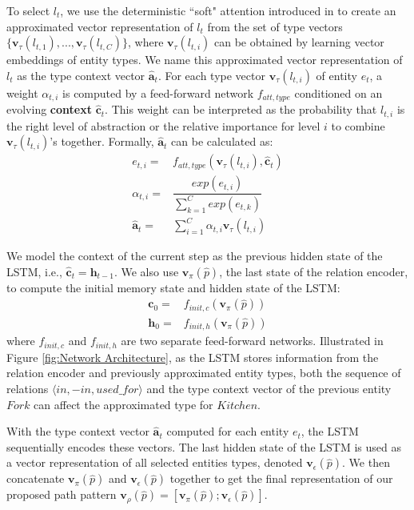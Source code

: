 \documentclass[letterpaper]{article} %
\begin{document}
To select $l_t$, we use the deterministic ``soft" attention introduced in \cite{ntm} to create an approximated vector representation of $l_t$ from the set of type vectors $\{\bm{v}_\tau(l_{t,1}),...,\bm{v}_\tau(l_{t,C})\}$, where $\bm{v}_\tau(l_{t,i})$ can be obtained by learning vector embeddings of entity types. We name this approximated vector representation of $l_t$ as the type context vector $\hat{\mathbf{a}}_t$. For each type vector $\bm{v}_\tau(l_{t,i})$ of entity $e_t$, a weight $\alpha_{t,i}$ is computed by a feed-forward network $f_{att, type}$ conditioned on an evolving \textbf{context} $\hat{\mathbf{c}}_t$. This weight can be interpreted as the probability that $l_{t,i}$ is the right level of abstraction or the relative importance for level $i$ to combine $\bm{v}_\tau(l_{t,i})$'s together. Formally, $\hat{\mathbf{a}}_t$ can be calculated as:%
\begin{align}
	e_{t,i} =& f_{att, type}(\bm{v}_\tau(l_{t,i}), \hat{\mathbf{c}}_t) \\
	\alpha_{t,i} =& \dfrac{exp(e_{t,i})}{\sum_{k=1}^{C} exp(e_{t,k})}\\
	\hat{\mathbf{a}}_t =& \sum_{i=1}^{C} \alpha_{t,i} \bm{v}_\tau(l_{t,i})
\end{align} %

We model the context of the current step as the previous hidden state of the LSTM, i.e., $\hat{\mathbf{c}}_t = \bm{h}_{t-1}$.
We also use $\bm{v}_\pi(\hat{p})$, the last state of the relation encoder, to compute the initial memory state and hidden state of the LSTM:%
\begin{align}
	\bm{c}_0 =& f_{init, c}(\bm{v}_\pi(\hat{p})) \\
	\bm{h}_0 =& f_{init, h}(\bm{v}_\pi(\hat{p}))
\end{align} %
where $f_{init, c}$ and $f_{init, h}$ are two separate feed-forward networks. Illustrated in Figure \ref{fig:Network Architecture}, as the LSTM stores information from the relation encoder and previously approximated entity types, both the sequence of relations $\langle in, -in, used\_for \rangle$ and the type context vector of the previous entity $Fork$ can affect the approximated type for $Kitchen$.



With the type context vector $\hat{\mathbf{a}}_t$ computed for each entity $e_t$, the LSTM sequentially encodes these vectors. The last hidden state of the LSTM is used as a vector representation of all selected entities types, denoted $\bm{v}_\epsilon(\hat{p})$. We then concatenate $\bm{v}_\pi(\hat{p})$ and $\bm{v}_\epsilon(\hat{p})$ together to get the final representation of our proposed path pattern $\bm{v}_\rho(\hat{p}) = [\bm{v}_\pi(\hat{p});\bm{v}_\epsilon(\hat{p})]$.
\end{document}
